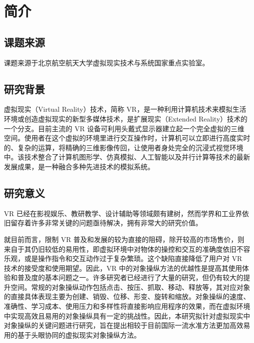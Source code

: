 \chapter{简介}

\section{课题来源}

课题来源于北京航空航天大学虚拟现实技术与系统国家重点实验室。

\section{研究背景}

虚拟现实（Virtual Reality）技术，简称 VR，是一种利用计算机技术来模拟生活环境或创造虚拟现实的新型多媒体技术，是扩展现实（Extended Reality）技术的一个分支。目前主流的 VR 设备可利用头戴式显示器建立起一个完全虚拟的三维空间。使用者在这个虚拟的环境里进行交互操作时，计算机可以立即进行高度实时的、复杂的运算，将精确的三维影像传回，让使用者身处完全的沉浸式视觉环境中。该技术整合了计算机图形学、仿真模拟、人工智能以及并行计算等技术的最新发展成果，是一种融合多种先进技术的模拟系统。


\section{研究意义}

VR 已经在影视娱乐、教研教学、设计辅助等领域颇有建树，然而学界和工业界依旧留存着许多非常关键的问题亟待解决，拥有非常大的研究价值。

就目前而言，限制 VR 普及和发展的较为直接的阻碍，除开较高的市场售价，则来自于其仍旧较低的易用性，即虚拟环境中对物体的操控和交互的准确度依旧不容乐观，或是操作指令和交互动作过于复杂繁琐。这个缺陷直接降低了用户对 VR 技术的接受度和使用期望。因此，VR 中的对象操纵方法的优越性是提高其使用体验和普及度的基本问题之一。许多研究者已经进行了大量的研究，但仍有较大的提升空间。常规的对象操纵动作包括点击、按压、抓取、移动、释放等，其对应对象的直接具体表现主要为创建、销毁、位移、形变、旋转和缩放。对象操纵的速度、准确性、学习成本、使用压力和多样性将直接影响应用程序的效果，而在虚拟环境中实现高效且易用的对象操纵具有一定的挑战性。因此，本研究拟针对虚拟现实中对象操纵的关键问题进行研究，旨在提出相较于目前国际一流水准方法更加高效易用的基于头眼协同的虚拟现实对象操纵方法。
